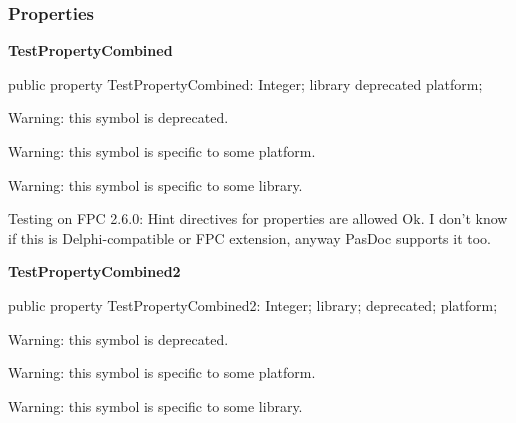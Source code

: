 \documentclass{report}
\newif\ifpdf
\begin{document}
\subsubsection*{\large{\textbf{Properties}}\normalsize\hspace{1ex}\hfill}
\begin{list}{}{
\setlength{\itemindent}{0cm}
\setlength{\listparindent}{0cm}
\setlength{\leftmargin}{\evensidemargin}
\addtolength{\leftmargin}{\tmplength}
\settowidth{\labelsep}{X}
\addtolength{\leftmargin}{\labelsep}
\setlength{\labelwidth}{\tmplength}
}
\label{ok_hint_directives.TTestClassDeprecated-TestPropertyCombined}
\item[\textbf{TestPropertyCombined}\hfill]
\ifpdf
\begin{flushleft}
\fi
\begin{ttfamily}
public property TestPropertyCombined: Integer; library deprecated platform;\end{ttfamily}

\ifpdf
\end{flushleft}
\fi


\par Warning: this symbol is deprecated.

Warning: this symbol is specific to some platform.

Warning: this symbol is specific to some library.

Testing on FPC 2.6.0: Hint directives for properties are allowed Ok. I don't know if this is Delphi{-}compatible or FPC extension, anyway PasDoc supports it too.\label{ok_hint_directives.TTestClassDeprecated-TestPropertyCombined2}
\item[\textbf{TestPropertyCombined2}\hfill]
\ifpdf
\begin{flushleft}
\fi
\begin{ttfamily}
public property TestPropertyCombined2: Integer; library; deprecated; platform;\end{ttfamily}

\ifpdf
\end{flushleft}
\fi


\par Warning: this symbol is deprecated.

Warning: this symbol is specific to some platform.

Warning: this symbol is specific to some library.

 \end{list}
\end{document}

